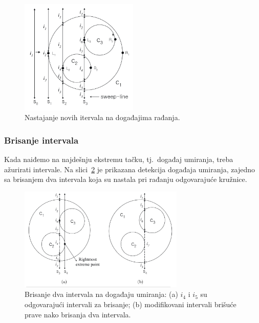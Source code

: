 \documentclass[a4paper,12pt]{article}
\begin{document}
\begin{figure}
\begin{center}
    \includegraphics[width=0.5\textwidth]{imgs/open.png}
\end{center}
    \caption{Nastajanje novih itervala na događajima rađanja.}
\label{fig:open}
\end{figure}

\subsubsection{Brisanje intervala}
\label{subsub:intdel}

Kada naiđemo na najdešnju ekstremu tačku, tj.\ događaj umiranja, treba ažurirati intervale. Na slici~\ref{fig:close} je prikazana detekcija događaja umiranja, zajedno sa brisanjem dva intervala koja su nastala pri rađanju odgovarajuće kružnice.

\begin{figure}
\begin{center}
    \includegraphics[width=0.7\textwidth]{imgs/close.png}
\end{center}
    \caption{Brisanje dva intervala na događaju umiranja: (a) $i_4$ i $i_5$ su odgovarajući intervali za brisanje; (b) modifikovani intervali brišuće prave nako brisanja dva intervala.}
\label{fig:close}
\end{figure}
\end{document}
